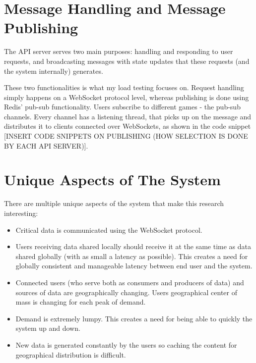 \documentclass{uvamscse}
\begin{document}
\section{Message Handling and Message Publishing}

The API server serves two main purposes: handling and responding to user requests, and broadcasting messages with state updates that these requests (and the system internally) generates.

These two functionalities is what my load testing focuses on. Request handling simply happens on a WebSocket protocol level, whereas publishing is done using Redis' pub-sub functionality. Users subscribe to different games - the pub-sub channels. Every channel has a listening thread, that picks up on the message and distributes it to clients connected over WebSockets, as shown in the code snippet [INSERT CODE SNIPPETS ON PUBLISHING (HOW SELECTION IS DONE BY EACH API SERVER)].

\section{Unique Aspects of The System}

There are multiple unique aspects of the system that make this research interesting:

\begin{itemize}
  \item Critical data is communicated using the WebSocket protocol.
  \item Users receiving data shared locally should receive it at the same time as data shared globally (with as small a latency as possible). This creates a need for globally consistent and manageable latency between end user and the system.
  \item Connected users (who serve both as consumers and producers of data) and sources of data are geographically changing. Users geographical center of mass is changing for each peak of demand.
  \item Demand is extremely lumpy. This creates a need for being able to quickly the system up and down.
  \item New data is generated constantly by the users so caching the content for geographical distribution is difficult.
\end{itemize}


\end{document}
